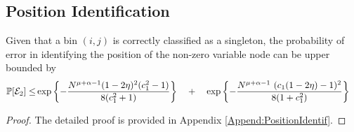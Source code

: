 \subsection{\bf Position Identification}
\begin{lemma}
Given that a bin $(i,j)$ is correctly classified as a singleton, the probability of error in identifying the position of the non-zero variable node can be upper bounded by
\begin{align*}
\mathbb{P}[\mathcal{E}_2]\leq & \exp\left\lbrace-\frac{N^{\mu+\alpha-1}(1-2\eta)^2(c_1^2-1)}{8(c_1^2+1)}\right\rbrace
 \quad + \quad \exp\left\lbrace-\frac{N^{\mu+\alpha-1} ~ (c_1(1 - 2\eta) - 1)^2}{8(1+ c_1^2)}\right\rbrace
\end{align*}\label{Lem:posidentification}
\end{lemma}
\begin{proof}
	The detailed proof is provided in Appendix \ref{Append:PositionIdentif}.
\end{proof}

